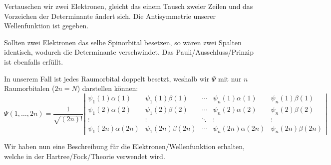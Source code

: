 Vertauschen wir zwei Elektronen, gleicht das einem Tausch zweier Zeilen
und das Vorzeichen der Determinante ändert sich.
Die Antisymmetrie unserer Wellenfunktion ist gegeben.

Sollten zwei Elektronen das selbe Spinorbital besetzen,
so wären zwei Spalten identisch, wodurch die Determinante verschwindet.
Das Pauli\-/Ausschluss\-/Prinzip ist ebenfalls erfüllt.

\cite[S. 50]{szabo_ostlund_1996}

In unserem Fall ist jedes Raumorbital doppelt besetzt,
weshalb wir $\Psi$ mit nur $n$ Raumorbitalen ($2n = N$) darstellen können:
\begin{equation}
\Psi(1, \dots, 2n) = 
\frac{1}{\sqrt{(2n)!}}
\left\lvert
\begin{array}{ccccc} 
\psi_1(1)\alpha(1) & \psi_1(1)\beta(1) & \cdots & \psi_n(1)\alpha(1) & \psi_n(1)\beta(1)\\ 
\psi_1(2)\alpha(2) & \psi_1(2)\beta(2) & \cdots & \psi_n(2)\alpha(2) & \psi_n(2)\beta(2)\\ 
    \vdots         &       \vdots      & \ddots &       \vdots       &       \vdots     \\ 
\psi_1(2n)\alpha(2n) & \psi_1(2n)\beta(2n) & \cdots & \psi_n(2n)\alpha(2n) & \psi_n(2n) \beta(2n)
\end{array}
\right\rvert
\end{equation}
\cite[S. 202]{lewars_2016}

Wir haben nun eine Beschreibung für die Elektronen\-/Wellenfunktion erhalten,
welche in der Hartree\-/Fock\-/Theorie verwendet wird.